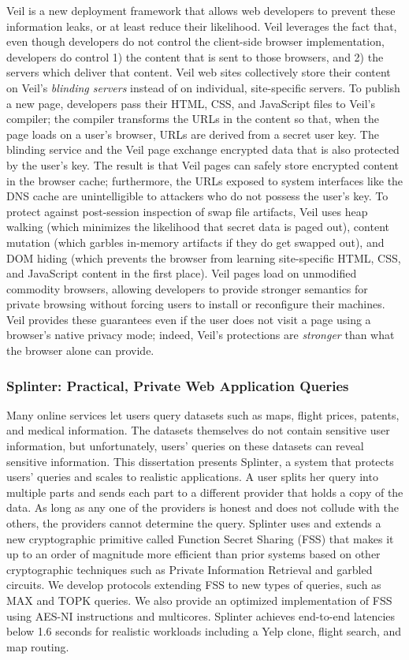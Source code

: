 Veil is a new deployment framework that allows
web developers to prevent these information leaks,
or at least reduce their likelihood. Veil leverages
the fact that, even though developers do not control the
client-side browser implementation, developers do
control 1) the content that is sent to those browsers,
and 2) the servers which deliver that content.
Veil web sites collectively store their content
on Veil's \emph{blinding servers} instead
of on individual, site-specific servers. To publish
a new page, developers pass their HTML, CSS, and
JavaScript files to Veil's compiler; the compiler
transforms the URLs in the content so that, when
the page loads on a user's browser, URLs are derived
from a secret user key. The blinding service and
the Veil page exchange encrypted
data that is also protected by the user's key. The
result is that Veil pages can safely store encrypted
content in the browser cache; furthermore, the URLs exposed
to system interfaces like the DNS cache are
unintelligible to attackers who do not possess
the user's key. To protect against post-session
inspection of swap file artifacts, Veil uses
heap walking (which minimizes the likelihood that
secret data is paged out), content mutation (which
garbles in-memory artifacts if they do get swapped out),
and DOM hiding (which prevents the browser from
learning site-specific HTML, CSS, and JavaScript
content in the first place). Veil pages load on unmodified
commodity browsers, allowing developers to provide
stronger semantics for private browsing without forcing
users to install or reconfigure their machines. Veil
provides these guarantees even if the user does not
visit a page using a browser's native privacy mode;
indeed, Veil's protections are \emph{stronger}
than what the browser alone can provide.

\subsubsection{Splinter: Practical, Private Web Application Queries}

Many online services let users query datasets such as maps, flight prices, patents,
and medical information. The datasets themselves do not contain sensitive user information,
but unfortunately, users' queries on these datasets can reveal sensitive information.
This dissertation presents Splinter, a system that protects users' queries and
scales to realistic applications.
A user splits her query into multiple parts and sends each part 
to a different provider that holds a copy of the data.
As long as any one of the providers is honest and does not collude with the
others, the providers cannot determine the query.
Splinter uses and extends a new cryptographic primitive called Function Secret Sharing (FSS) 
that makes it up to an order of magnitude more efficient than prior systems based on 
other cryptographic techniques such as Private Information Retrieval and garbled circuits.
We develop protocols extending FSS to new types of queries, such as MAX and TOPK queries. 
We also provide an optimized implementation of FSS using AES-NI instructions and multicores.
Splinter achieves end-to-end latencies below 1.6 seconds for realistic workloads 
including a Yelp clone, flight search, and map routing.

